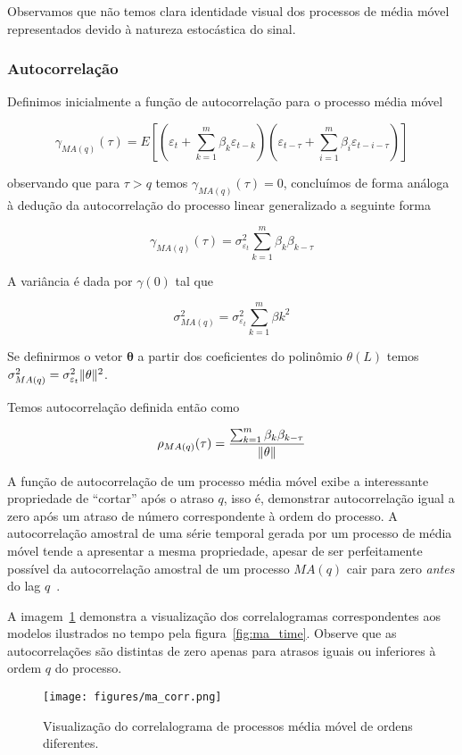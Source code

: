 Observamos que não temos clara identidade visual dos processos de média móvel
representados devido à natureza estocástica do sinal.

\subsubsection{Autocorrelação}

Definimos inicialmente a função de autocorrelação para o processo média móvel

$$\gamma_{MA(q)}(\tau) = E\left[\left(\varepsilon_t + \sum^{m}_{k=1} \beta_k \varepsilon_{t-k}\right)\left( \varepsilon_{t-\tau} + \sum^{m}_{i=1} \beta_i \varepsilon_{t-i-\tau}\right) \right] $$

observando que para $\tau > q$ temos $\gamma_{MA(q)}(\tau) = 0$, concluímos de
forma análoga à dedução da autocorrelação do processo linear generalizado a
seguinte forma

$$\gamma_{MA(q)}(\tau) = \sigma_{\varepsilon_t}^2 \sum^{m}_{k=1} \beta_k\beta_{k-\tau} $$

A variância é dada por $\gamma(0)$ tal que

$$\sigma^{2}_{MA(q)} = \sigma_{\varepsilon_t}^2 \sum^{m}_{k=1} \beta{k}^2 $$

Se definirmos o vetor $\mathbf{\theta}$ a partir dos coeficientes do polinômio
$\theta(L)$ temos $\sigma^{2}_{MA(q)} = \sigma_{\varepsilon_t}^2\lVert\mathbf{\theta}\rVert^2$.

Temos autocorrelação definida então como

$$\rho_{MA(q)}(\tau) = \frac{\sum^{m}_{k=1} \beta_k\beta_{k-\tau}}{\lVert\mathbf{\theta}\rVert}$$

A função de autocorrelação de um processo média móvel exibe a interessante
propriedade de ``cortar'' após o atraso $q$, isso é, demonstrar autocorrelação
igual a zero após um atraso de número correspondente à ordem do processo. A
autocorrelação amostral de uma série temporal gerada por um processo de média
móvel tende a apresentar a mesma propriedade, apesar de ser perfeitamente
possível da autocorrelação amostral de um processo $MA(q)$ cair para zero
\emph{antes} do lag $q$~\cite{chatfield}.

A imagem~\ref{fig:ma_corr} demonstra a visualização dos correlalogramas
correspondentes aos modelos ilustrados no tempo pela figura~\ref{fig:ma_time}.
Observe que as autocorrelações são distintas de zero apenas para atrasos
iguais ou inferiores à ordem $q$ do processo.

\begin{figure}[H]
    \centering
    \texttt{[image: figures/ma\_corr.png]}
    \caption{Visualização do correlalograma de processos média móvel de ordens
    diferentes.}
    \label{fig:ma_corr}
\end{figure}

